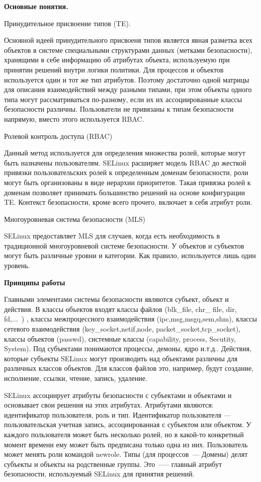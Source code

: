 \bigskip
{\bfseries Основные понятия. }

\bigskip
Принудительное присвоение типов (TE). 

Основной идеей принудительного присвоеня
типов является явная разметка всех объектов 
в системе специальными структурами данных 
(метками безопасности), хранящими в себе информацию
об атрибутах объекта, используемую при принятии 
решений внутри логики политики. 
Для процессов и объектов используется 
один и тот же тип атрибутов. Поэтому достаточно 
одной матрицы для описания взаимодействий между 
разными типами, при этом объекты одного типа могут 
рассматриваться по-разному, если их их ассоциированные 
классы безопасности различны. Пользователи не 
привязаны к типам безопасности напрямую, вместо 
этого используется RBAC.

\bigskip
Ролевой контроль доступа (RBAC) 

Данный метод используется для определения 
множества ролей, которые могут 
быть назначены пользователям. SELinux расширяет 
модель RBAC до жесткой привязки пользовательских 
ролей к определенным доменам безопасности, роли 
могут быть организованы в виде иерархии приоритетов. 
Такая привязка ролей к доменам позволяет принимать 
большинство решений на основе конфигурации TE. 
Контекст безопасности, кроме всего прочего, включает 
в себя атрибут роли.

\bigskip
Многоуровневая система безопасности (MLS) 

SELinux предоставляет MLS для случаев, когда есть 
необходимость в традиционной многоуровневой системе 
безопасности. У объектов и субъектов могут быть 
различные уровни и категории. 
Как правило, используется лишь один уровень. 

\bigskip
{\bfseries Принципы работы}

Главными элементами системы безопасности 
являются субъект, объект и действия. В классы 
объектов входят классы файлов (blk\_file, chr\_
file, dir, fd,...\ ) ,  классы межпроцессного 
взаимодействия (ipc,msg,msgq,sem,shm), классы 
сетевого взаимодействия (key\_socket,netif,node,
packet\_socket,tcp\_socket), классы объектов 
(passwd), системные классы (capability, process,
Secutity, System). Под субъектами понимаются 
процессы, демоны, ядро и.т.д.. Действия, которые субъекты 
SELinux могут производить над объектами 
различны для различных классов объектов. 
Для классов файлов это, например, 
будут создание, исполнение, ссылки, чтение, запись, 
удаление. 

SELinux ассоциирует атрибуты безопасности 
с субъектами и объектами и основывает свои решения 
на этих атрибутах. Атрибутами являются: идентификатор 
пользователя, роль и тип. Идентификатор пользователя 
— пользовательская учетная запись, ассоциированная с 
субъектом или объектом. У каждого пользователя может 
быть несколько ролей, но в какой-то конкретный момент
времени ему может быть предписана только одна из них. 
Пользователь может менять роли командой newrole. Типы 
(для процессов~--- Домены) делят субъекты и объекты на родственные 
группы. Это~--— главный атрибут безопасности, используемый 
SELinux для принятия решений. 

